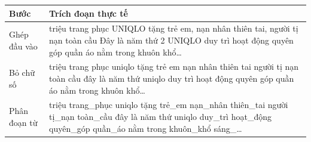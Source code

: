 \begin{tabularx}{\linewidth}{>{\raggedright\arraybackslash}p{36mm}>{\raggedright\arraybackslash}X}
\toprule
Bước & Trích đoạn thực tế\\\midrule
Ghép đầu vào & 1 triệu trang phục UNIQLO tặng trẻ em, nạn nhân thiên tai, người tị nạn toàn cầu Đây là năm thứ 2 UNIQLO duy trì hoạt động quyên góp quần áo nằm trong khuôn khổ\ldots\\
Bỏ chữ số &   triệu trang phục uniqlo tặng trẻ em  nạn nhân thiên tai  người tị nạn toàn cầu đây là năm thứ   uniqlo duy trì hoạt động quyên góp quần áo nằm trong khuôn khổ\ldots\\
Phân đoạn từ & triệu trang\_phục uniqlo tặng trẻ\_em nạn\_nhân thiên\_tai người tị\_nạn toàn\_cầu đây là năm thứ uniqlo duy\_trì hoạt\_động quyên\_góp quần\_áo nằm trong khuôn\_khổ sáng\_\ldots\\
\bottomrule\end{tabularx}
